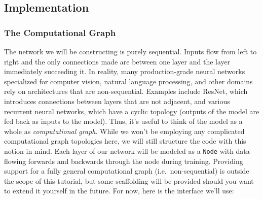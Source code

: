 \documentclass[
]{article}
\begin{document}
\hypertarget{implementation}{%
\subsection{Implementation}\label{implementation}}

\hypertarget{the-computational-graph}{%
\subsubsection{The Computational Graph}\label{the-computational-graph}}

The network we will be constructing is purely sequential. Inputs flow
from left to right and the only connections made are between one layer
and the layer immediately succeeding it. In reality, many
production-grade neural networks specialized for computer vision,
natural language processing, and other domains rely on architectures
that are non-sequential. Examples include ResNet, which introduces
connections between layers that are not adjacent, and various recurrent
neural networks, which have a cyclic topology (outputs of the model are
fed back as inputs to the model). Thus, it's useful to think of the
model as a whole as \emph{computational graph}. While we won't be
employing any complicated computational graph topologies here, we will
still structure the code with this notion in mind. Each layer of our
network will be modeled as a \texttt{Node} with data flowing forwards
and backwards through the node during training. Providing support for a
fully general computational graph (i.e.~non-sequential) is outside the
scope of this tutorial, but some scaffolding will be provided should you
want to extend it yourself in the future. For now, here is the interface
we'll use:
\end{document}
